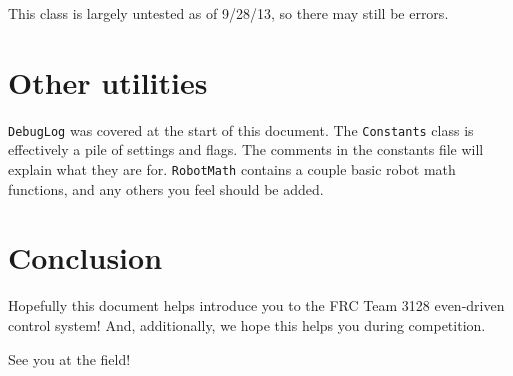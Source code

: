 \documentclass[a4paper]{article}
\begin{document}
This class is largely untested as of 9/28/13, so there may still be errors.

\section{Other utilities}

\lstinline{DebugLog} was covered at the start of this document. The \lstinline{Constants} class is effectively a pile of settings and flags. The comments in the constants file will explain what they are for. \lstinline{RobotMath} contains a couple basic robot math functions, and any others you feel should be added.

\section{Conclusion}

Hopefully this document helps introduce you to the FRC Team 3128 even-driven control system! And, additionally, we hope this helps you during competition.

See you at the field!
\end{document}
